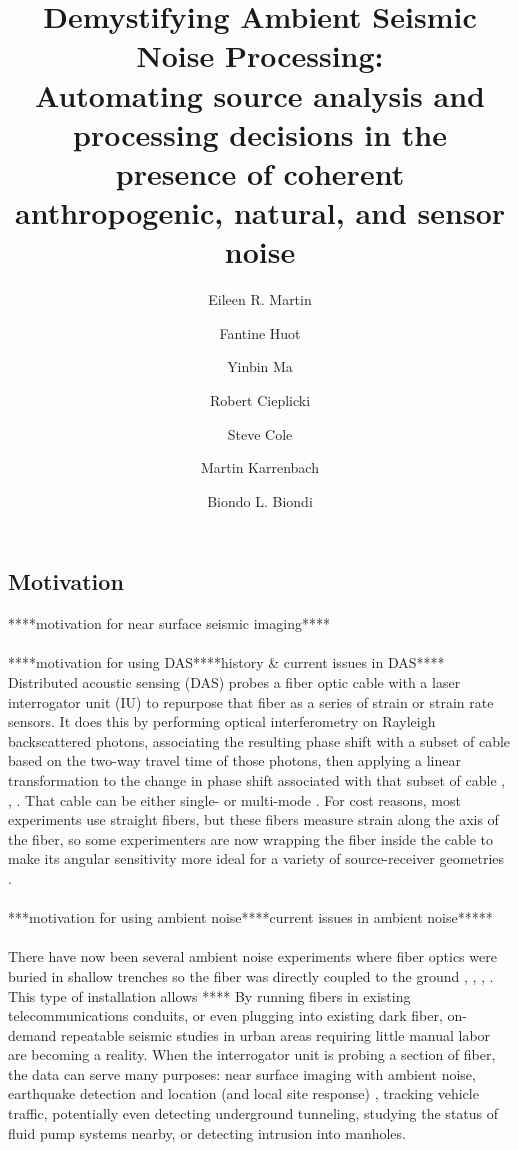\documentclass[11pt]{article}
\title{\vspace{-1.8cm} \Large Demystifying Ambient Seismic Noise Processing: \\Automating source analysis and processing decisions in the presence of coherent anthropogenic, natural, and sensor noise \vspace{-0.4cm}}
\author[1,2]{\small Eileen R. Martin}
\author[2]{Fantine Huot}
\author[1]{Yinbin Ma}
\author[2]{Robert Cieplicki}
\author[3]{Steve Cole}
\author[3]{Martin Karrenbach}
\author[1,2]{Biondo L. Biondi \vspace{-0.3cm}}
\affil[1]{Institute for Computational and Mathematical Engineering, Stanford University, Stanford, CA}
\affil[2]{Department of Geophysics, Stanford University, Stanford, CA}
\affil[3]{OptaSense, Brea, CA}
\date{}
\begin{document}
\maketitle

\vspace{-1.8cm}
\subsection*{Motivation} 
\vspace{-0.2cm}
****motivation for near surface seismic imaging****
\\
\\
****motivation for using DAS****history \& current issues in DAS****
Distributed acoustic sensing (DAS) probes a fiber optic cable with a laser interrogator unit (IU) to repurpose that fiber as a series of strain or strain rate sensors. It does this by performing optical interferometry on Rayleigh backscattered photons, associating the resulting phase shift with a subset of cable based on the two-way travel time of those photons, then applying a linear transformation to the change in phase shift associated with that subset of cable \cite{Posey2000}, \cite{Daley2013}, \cite{Bakku2015}. That cable can be either single- or multi-mode \cite{Miller2016}. For cost reasons, most experiments use straight fibers, but these fibers measure strain along the axis of the fiber, so some experimenters are now wrapping the fiber inside the cable to make its angular sensitivity more ideal for a variety of source-receiver geometries \cite{Kuvshinov2016}.
\\
\\
***motivation for using ambient noise****current issues in ambient noise*****
\\
\\
There have now been several ambient noise experiments where fiber optics were buried in shallow trenches so the fiber was directly coupled to the ground \cite{AjoFranklin2015}, \cite{Martin2015}, \cite{Martin2016}, \cite{Zeng2017}. This type of installation allows ****
By running fibers in existing telecommunications conduits, or even plugging into existing dark fiber, on-demand repeatable seismic studies in urban areas requiring little manual labor are becoming a reality. When the interrogator unit is probing a section of fiber, the data can serve many purposes: near surface imaging with ambient noise, earthquake detection and location (and local site response) \cite{Martin2017}, tracking vehicle traffic, potentially even detecting underground tunneling, studying the status of fluid pump systems nearby, or detecting intrusion into manholes. 
\end{document}
